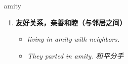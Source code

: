 
\begin{frame}
{\huge amity}
\begin{center}
\begin{enumerate}\Large
  \item \textbf{友好关系，亲善和睦（与邻居之间）}
  \begin{itemize}
    \item \em{\Large{living in amity with neighbors.}}
    \item \em{\Large{They parted in amity. 和平分手}}
  \end{itemize}
\end{enumerate}
\end{center}
\end{frame}
